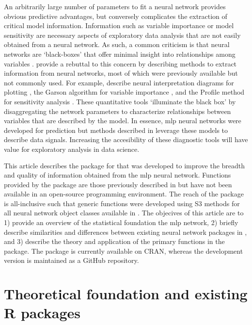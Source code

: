 \documentclass[article,shortnames]{jss}\usepackage[]{graphicx}\usepackage[]{color}
\begin{document}
An arbitrarily large number of parameters to fit a neural network provides obvious predictive advantages, but conversely complicates the extraction of critical model information.  Information such as variable importance or model sensitivity are necessary aspects of exploratory data analysis that are not easily obtained from a neural network. As such, a common criticism is that neural networks are `black-boxes' that offer minimal insight into relationships among variables \citep[e.g.,][]{Paruelo97}.  \citet{Olden02} provide a rebuttal to this concern by describing methods to extract information from neural networks, most of which were previously available but not commonly used.  For example, \citet{Olden02} describe neural interpretation diagrams for plotting \citep{Ozesmi99}, the Garson algorithm for variable importance \citep{Garson91}, and the Profile method for sensitivity analysis \citep{Lek96}.  These quantitative tools `illuminate the black box' by disaggregating the network parameters to characterize relationships between variables that are described by the model.  In essence, \ac{mlp} neural networks were developed for prediction but methods described in \citep{Olden02} leverage these models to describe data signals.  Increasing the accesibility of these diagnostic tools will have value for exploratory analysis in data science.

This article describes the  package for  that was developed to improve the breadth and quality of information obtained from the \ac{mlp} neural network.  Functions provided by the package are those previously described in \citep{Olden02} but have not been available in an open-source programming environment.  The reach of the package is all-inclusive such that generic functions were developed using S3 methods for all neural network object classes available in .  The objecives of this article are to 1) provide an overview of the statistical foundation the \ac{mlp} network, 2) briefly describe similarities and differences between existing neural network packages in , and 3) describe the theory and application of the primary functions in the  package.  The package is currently available on CRAN, whereas the development version is maintained as a GitHub repository.  

\section[Theoretical foundation]{Theoretical foundation and existing R packages}
\end{document}
